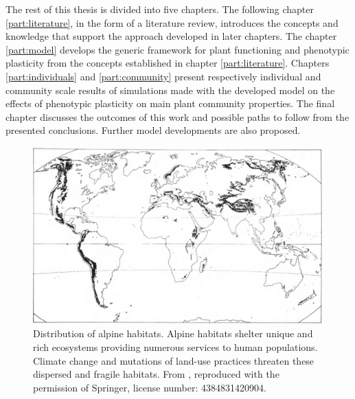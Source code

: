 The rest of this thesis is divided into five chapters. The following chapter \ref{part:literature}, in the form of a literature review, introduces the concepts and knowledge that support the approach developed in later chapters. The chapter \ref{part:model} develops the generic framework for plant functioning and phenotypic plasticity from the concepts established in chapter \ref{part:literature}. Chapters \ref{part:individuals} and \ref{part:community} present respectively individual and community scale results of simulations made with the developed model \model on the effects of phenotypic plasticity on main plant community properties. The final chapter discusses the outcomes of this work and possible paths to follow from the presented conclusions. Further model developments are also proposed.


\begin{figure}
\includegraphics{./1_Introduction/graphics/alpine_distribution.jpeg}
\caption{Distribution of alpine habitats. Alpine habitats shelter unique and rich ecosystems providing numerous services to human populations. Climate change and mutations of land-use practices threaten these dispersed and fragile habitats. From \cite{korner_alpine_2003}, reproduced with the permission of Springer, license number: 4384831420904.} \label{fig:distribution}
\end{figure}

